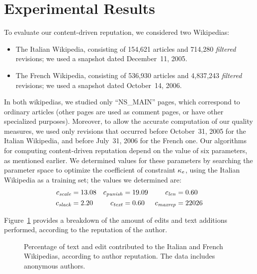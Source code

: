 \section{Experimental Results}

To evaluate our content-driven reputation, we considered two Wikipedias: 
%
\begin{itemize}

\item The Italian Wikipedia, consisting of 154,621 articles and 714,280
  {\em filtered\/} revisions; we used a snapshot dated December~11, 2005. 
\item The French Wikipedia, consisting of 536,930 articles and
  4,837,243 {\em filtered\/} revisions; we used a snapshot dated
  October~14, 2006. 

\end{itemize}
%
In both wikipedias, we studied only ``NS\_MAIN'' pages, which
correspond to ordinary articles (other pages are used as comment
pages, or have other specialized purposes). 
Moreover, to allow the accurate computation of our quality
measures, we used only revisions that occurred before October~31, 2005 for
the Italian Wikipedia, and before July~31, 2006 for the French one. 
Our algorithms for computing content-driven reputation depend on the
value of six parameters, as mentioned earlier. 
We determined values for these parameters by searching the parameter
space to optimize the coefficient of constraint $\kappa_e$, using the Italian
Wikipedia as a training set; the values we determined are: 
%
\begin{align*}
   {c_{{\text{\textit{scale}}}}}      & = 13.08
  & {c_{{\text{\textit{punish}}}}}   & = 19.09
  & {c_{{\text{\textit{len}}}}}     & = 0.60   \\
   {c_{{\text{\textit{slack}}}}}         & = 2.20
  & {c_{{\text{\textit{text}}}}}     & = 0.60
  & {c_{{\text{\textit{maxrep}}}}}   & = 22026
\end{align*}

Figure~\ref{fig:user-breakdown-by-rep} provides a breakdown of
the amount of edits and text additions performed, according to the
reputation of the author.

\begin{figure}
\begin{center}

\end{center}
\caption{Percentage of text and edit contributed to the
  Italian and French Wikipedias, according to author reputation. 
  The data includes anonymous authors.}
\label{fig:user-breakdown-by-rep}
\end{figure}


